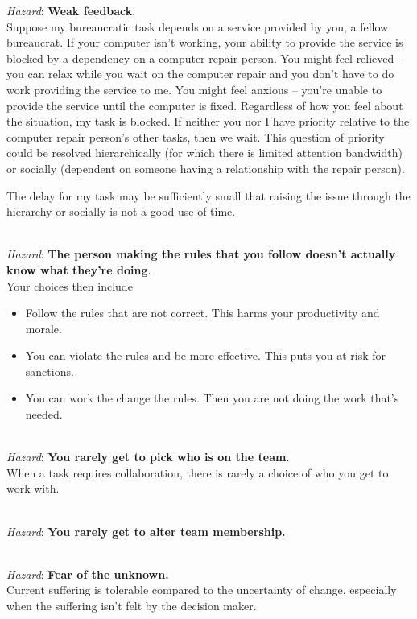 \textit{Hazard}: \textbf{Weak feedback}. \\
Suppose my bureaucratic task depends on a service provided by you, a fellow bureaucrat. If your computer isn't working, your ability to provide the service is blocked by a dependency on a computer repair person. You might feel relieved -- you can relax while you wait on the computer repair and you don't have to do work providing the service to me. You might feel anxious -- you're unable to provide the service until the computer is fixed. Regardless of how you feel about the situation, my task is blocked. If neither you nor I have priority relative to the computer repair person's other tasks, then we wait. This question of priority could be resolved hierarchically (for which there is limited attention bandwidth) or socially (dependent on someone having a relationship with the repair person). 

The delay for my task may be sufficiently small that raising the issue through the hierarchy or socially is not a good use of time.

\ \\

\textit{Hazard}: \textbf{The person making the rules that you follow doesn't actually know what they're doing}. \\
Your choices then include
\begin{itemize}
    \item Follow the rules that are not correct. This harms your productivity and morale. 
\item You can violate the rules and be more effective. This puts you at risk for sanctions. 
\item You can work the change the rules. Then you are not doing the work that's needed.
\end{itemize}


\ \\

\textit{Hazard}: \textbf{You rarely get to pick who is on the team}. \\
When a task requires collaboration, there is rarely a choice of who you get to work with. 

\ \\

\textit{Hazard}: \textbf{You rarely get to alter team membership.}

\ \\

\textit{Hazard}: \textbf{Fear of the unknown.}\\
Current suffering is tolerable compared to the uncertainty of change, especially when the suffering isn't felt by the decision maker.

